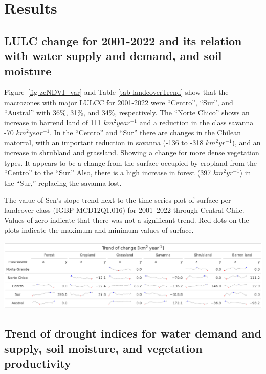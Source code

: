 \documentclass[
  authoryear,
  preprint,
  3p,
  onecolumn]{elsarticle}
\begin{document}
\hypertarget{results}{%
\section{Results}\label{results}}

\hypertarget{lulc-change-for-2001-2022-and-its-relation-with-water-supply-and-demand-and-soil-moisture}{%
\subsection{LULC change for 2001-2022 and its relation with water supply
and demand, and soil
moisture}\label{lulc-change-for-2001-2022-and-its-relation-with-water-supply-and-demand-and-soil-moisture}}

Figure~\ref{fig-zcNDVI_var} and Table \ref{tab-landcoverTrend} show that
the macrozones with major LULCC for 2001-2022 were ``Centro'', ``Sur'',
and ``Austral'' with 36\%, 31\%, and 34\%, respectively. The ``Norte
Chico'' shows an increase in barrend land of 111 \(km^2 year^{-1}\) and
a reduction in the class savanna -70 \(km^2 year^{-1}\). In the
``Centro'' and ``Sur'' there are changes in the Chilean matorral, with
an important reduction in savanna (-136 to -318 \(km^2 yr^{-1}\)), and
an increase in shrubland and grassland. Showing a change for more dense
vegetation types. It appears to be a change from the surface occupied by
cropland from the ``Centro'' to the ``Sur.'' Also, there is a high
increase in forest (397 \(km^2 yr^{-1}\)) in the ``Sur,'' replacing the
savanna lost.

\begin{table}[!ht]
\caption{The value of Sen's slope trend next to the time-series plot of surface per landcover class (IGBP MCD12Q1.016) for 2001–2022 through Central Chile. Values of zero indicate that there was not a significant trend. Red dots on the plots indicate the maximum and minimum values of surface.}
\label{tab-landcoverTrend}
\includegraphics[]{../output/figs/table_var_landcover_macro.png}
\end{table}

\hypertarget{trend-of-drought-indices-for-water-demand-and-supply-soil-moisture-and-vegetation-productivity-1}{%
\subsection{Trend of drought indices for water demand and supply, soil
moisture, and vegetation
productivity}\label{trend-of-drought-indices-for-water-demand-and-supply-soil-moisture-and-vegetation-productivity-1}}
\end{document}
